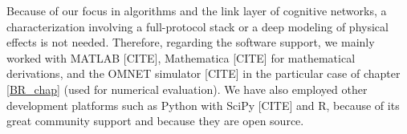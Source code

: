 Because of our focus in algorithms and the link layer of cognitive networks, a characterization involving a full-protocol stack or a deep modeling of physical effects is not needed. Therefore, regarding the software support, we mainly worked with MATLAB [CITE], Mathematica [CITE] for mathematical derivations, and the OMNET simulator [CITE] in the particular case of chapter \ref{BR_chap} (used for numerical evaluation). We have also employed other development platforms such as Python with SciPy [CITE] and R, because of its great community support and because they are open source.



